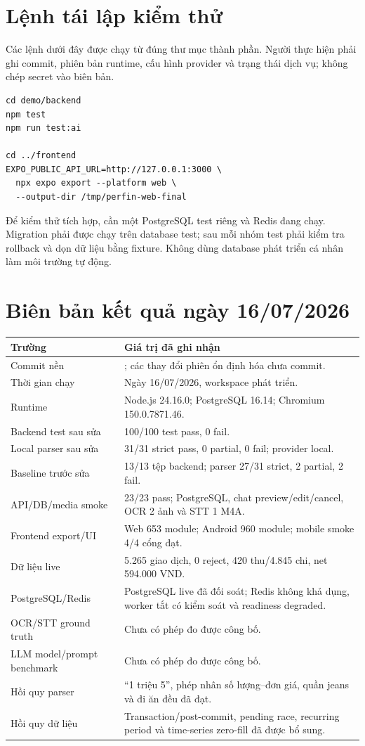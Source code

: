 \chapter{Lệnh tái lập kiểm thử}

Các lệnh dưới đây được chạy từ đúng thư mục thành phần. Người thực hiện phải ghi commit, phiên bản runtime, cấu hình provider và trạng thái dịch vụ; không chép secret vào biên bản.

\begin{verbatim}
cd demo/backend
npm test
npm run test:ai

cd ../frontend
EXPO_PUBLIC_API_URL=http://127.0.0.1:3000 \
  npx expo export --platform web \
  --output-dir /tmp/perfin-web-final
\end{verbatim}

Để kiểm thử tích hợp, cần một PostgreSQL test riêng và Redis đang chạy. Migration phải được chạy trên database test; sau mỗi nhóm test phải kiểm tra rollback và dọn dữ liệu bằng fixture. Không dùng database phát triển cá nhân làm môi trường tự động.

\chapter{Biên bản kết quả ngày 16/07/2026}

\begin{longtable}{@{}L{4.0cm}L{10.5cm}@{}}
  \toprule
  \textbf{Trường} & \textbf{Giá trị đã ghi nhận} \\
  \midrule
  Commit nền & ; các thay đổi phiên ổn định hóa chưa commit. \\
  Thời gian chạy & Ngày 16/07/2026, workspace phát triển. \\
  Runtime & Node.js 24.16.0; PostgreSQL 16.14; Chromium 150.0.7871.46. \\
  Backend test sau sửa & 100/100 test pass, 0 fail. \\
  Local parser sau sửa & 31/31 strict pass, 0 partial, 0 fail; provider local. \\
  Baseline trước sửa & 13/13 tệp backend; parser 27/31 strict, 2 partial, 2 fail. \\
  API/DB/media smoke & 23/23 pass; PostgreSQL, chat preview/edit/cancel, OCR 2 ảnh và STT 1 M4A. \\
  Frontend export/UI & Web 653 module; Android 960 module; mobile smoke 4/4 cổng đạt. \\
  Dữ liệu live & 5.265 giao dịch, 0 reject, 420 thu/4.845 chi, net 594.000 VND. \\
  PostgreSQL/Redis & PostgreSQL live đã đối soát; Redis không khả dụng, worker tắt có kiểm soát và readiness degraded. \\
  OCR/STT ground truth & Chưa có phép đo được công bố. \\
  LLM model/prompt benchmark & Chưa có phép đo được công bố. \\
  Hồi quy parser & ``1 triệu 5'', phép nhân số lượng--đơn giá, quần jeans và đi ăn đều đã đạt. \\
  Hồi quy dữ liệu & Transaction/post-commit, pending race, recurring period và time-series zero-fill đã được bổ sung. \\
  \bottomrule
\end{longtable}

